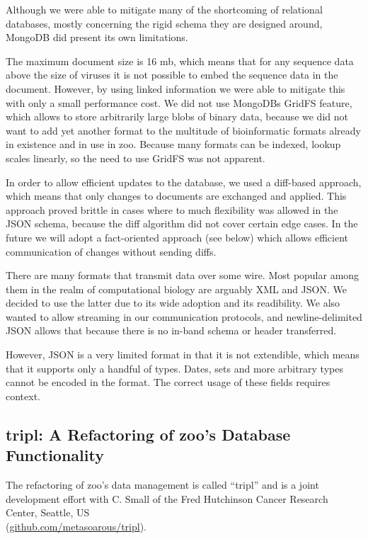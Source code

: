 Although we were able to mitigate many of the shortcoming of relational databases, mostly concerning the rigid schema they are designed around, MongoDB did present its own limitations.

The maximum document size is 16 mb, which means that for any sequence data above the size of viruses it is not possible to embed the sequence data in the document. However, by using linked information we were able to mitigate this with only a small performance cost. We did not use MongoDBs GridFS feature, which allows to store arbitrarily large blobs of binary data, because we did not want to add yet another format to the multitude of bioinformatic formats already in existence and in use in zoo. Because many formats can be indexed, lookup scales linearly, so the need to use GridFS was not apparent.

In order to allow efficient updates to the database, we used a diff-based approach, which means that only changes to documents are exchanged and applied. This approach proved brittle in cases where to much flexibility was allowed in the JSON schema, because the diff algorithm did not cover certain edge cases. In the future we will adopt a fact-oriented approach (see below) which allows efficient communication of changes without sending diffs.

There are many formats that transmit data over some wire. Most popular among them in the realm of computational biology are arguably XML and JSON. We decided to use the latter due to its wide adoption and its readibility. We also wanted to allow streaming in our communication protocols, and newline-delimited JSON allows that because there is no in-band schema or header transferred.

However, JSON is a very limited format in that it is not extendible, which means that it supports only a handful of types. Dates, sets and more arbitrary types cannot be encoded in the format. The correct usage of these fields requires context.


\subsection{tripl: A Refactoring of zoo's Database Functionality}

The refactoring of zoo's data management is called ``tripl'' and is a joint development effort with C. Small of the Fred Hutchinson Cancer Research Center, Seattle, US \\ (\hyperlink{https://github.com/metasoarous/tripl}{github.com/metasoarous/tripl}).

